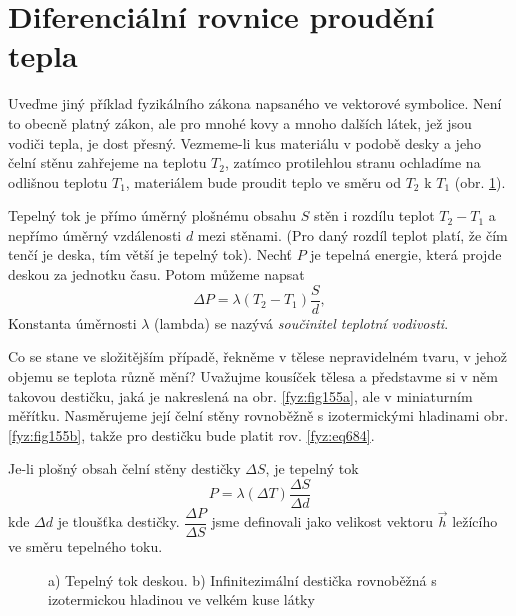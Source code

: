   \section{Diferenciální rovnice proudění tepla}
    Uveďme jiný příklad fyzikálního zákona napsaného ve vektorové symbolice. Není to obecně platný 
    zákon, ale pro mnohé kovy a mnoho dalších látek, jež jsou vodiči tepla, je dost přesný. 
    Vezmeme-li kus materiálu v podobě desky a jeho čelní stěnu zahřejeme na teplotu $T_2$, zatímco 
    protilehlou stranu ochladíme na odlišnou teplotu $T_1$, materiálem bude proudit teplo ve směru 
    od $T_2$ k $T_1$ (obr. \ref{fyz:fig155}).
    
    Tepelný tok je přímo úměrný plošnému obsahu $S$ stěn i rozdílu teplot $T_2-T_1$ a nepřímo 
    úměrný vzdálenosti $d$ mezi stěnami. (Pro daný rozdíl teplot platí, že čím tenčí je deska, tím 
    větší je tepelný tok). Nechť $P$ je tepelná energie, která projde deskou za jednotku času. 
    Potom můžeme napsat
    \begin{equation}\label{fyz:eq684}
      \Delta P=\lambda(T_2-T_1)\frac{S}{d},
    \end{equation}
    Konstanta úměrnosti $\lambda$ (lambda) se nazývá \emph{součinitel teplotní vodivosti}.
    
    Co se stane ve složitějším případě, řekněme v tělese nepravidelném tvaru, v jehož objemu se 
    teplota různě mění? Uvažujme kousíček tělesa a představme si v něm takovou destičku, jaká je 
    nakreslená na obr. \ref{fyz:fig155a}, ale v miniaturním měřítku. Nasměrujeme její čelní 
    stěny rovnoběžně s izotermickými hladinami obr. \ref{fyz:fig155b}, takže pro destičku bude 
    platit rov. \ref{fyz:eq684}.
    
    Je-li plošný obsah čelní stěny destičky $\Delta S$, je tepelný tok
    \begin{equation}\label{fyz:eq683}
      P=\lambda(\Delta T)\frac{\Delta S}{\Delta d}
    \end{equation}
    kde $\Delta d$ je tloušťka destičky. $\dfrac{\Delta P}{\Delta S}$ jsme definovali jako velikost
    vektoru $\vec{h}$ ležícího ve směru tepelného toku. 

    \begin{figure}[ht!]
      \centering
      \caption{a) Tepelný tok deskou. b) Infinitezimální destička rovnoběžná s izotermickou 
               hladinou ve velkém kuse látky \cite[s.~38]{Feynman02}}
      \label{fyz:fig155}
    \end{figure}

